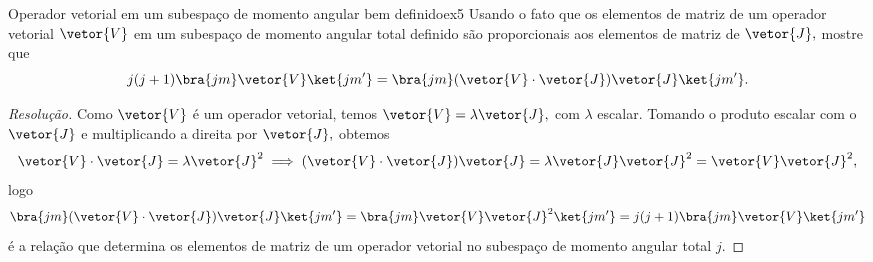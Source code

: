 \begin{exercício}{Operador vetorial em um subespaço de momento angular bem definido}{ex5}
   Usando o fato que os elementos de matriz de um operador vetorial \(\vetor{V}\) em um subespaço de momento angular total definido são proporcionais aos elementos de matriz de \(\vetor{J},\) mostre que
   \begin{equation*}
      j(j +1) \bra{jm}\vetor{V}\ket{j m'} = \bra{jm} (\vetor{V} \cdot\vetor{J})\vetor{J} \ket{jm'}.
   \end{equation*}
\end{exercício}
\begin{proof}[Resolução]
   Como \(\vetor{V}\) é um operador vetorial, temos \(\vetor{V} = \lambda \vetor{J},\) com \(\lambda\) escalar. Tomando o produto escalar com o \(\vetor{J}\) e multiplicando a direita por \(\vetor{J},\) obtemos
   \begin{equation*}
      \vetor{V} \cdot \vetor{J} = \lambda \vetor{J}^2 \implies (\vetor{V} \cdot \vetor{J}) \vetor{J} = \lambda \vetor{J} \vetor{J}^2 = \vetor{V} \vetor{J}^2,
   \end{equation*}
   logo
   \begin{equation*}
      \bra{jm}(\vetor{V}\cdot\vetor{J})\vetor{J}\ket{jm'} = \bra{jm} \vetor{V} \vetor{J}^2 \ket{jm'} = j(j+1) \bra{jm}\vetor{V} \ket{jm'}
   \end{equation*}
   é a relação que determina os elementos de matriz de um operador vetorial no subespaço de momento angular total \(j.\)
\end{proof}
